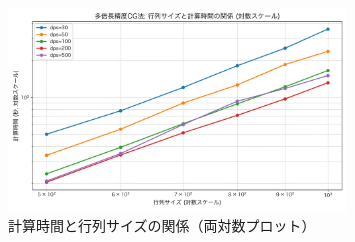 \documentclass{article}
\begin{document}
\begin{figure}[H]
    \centering
    \includegraphics[width=0.8\textwidth]{mpmath_time_loglog_plot.png}
    \caption{計算時間と行列サイズの関係（両対数プロット）}
    \label{fig:time_loglog_plot}
\end{figure}
\end{document}
